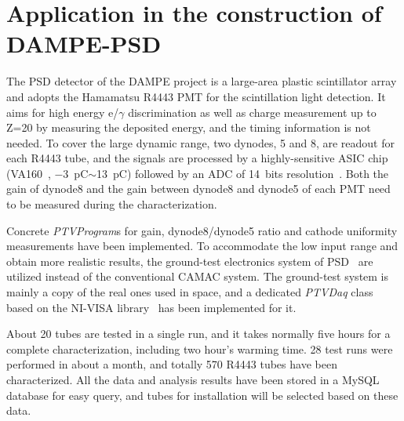 \documentclass{nst}
\begin{document}
\section{Application in the construction of DAMPE-PSD}
\label{sec:application}

The PSD detector of the DAMPE project is a large-area plastic scintillator array and adopts the Hamamatsu R4443 PMT for the scintillation light detection.
It aims for high energy e/$\gamma$ discrimination as well as charge measurement up to Z=20 by measuring the deposited energy, and the timing information is not needed.
To cover the large dynamic range, two dynodes, 5 and 8, are readout for each R4443 tube, 
and the signals are processed by a highly-sensitive ASIC chip (VA160~\cite{va160}, \SI{-3}{\pico\coulomb}$\sim$\SI{13}{\pico\coulomb}) followed by an ADC of 14~bits resolution~\cite{yanghaibo_fee}. 
Both the gain of dynode8 and the gain between dynode8 and dynode5 of each PMT need to be  measured during the characterization.

Concrete \textit{PTVProgram}s for gain, dynode8/dynode5 ratio and cathode uniformity measurements have been implemented.
To accommodate the low input range and obtain more realistic results, the ground-test electronics system of PSD~\cite{yanghaibo_fee} are utilized instead of the conventional CAMAC system. 
The ground-test system is mainly a copy of the real ones used in space, and a dedicated \textit{PTVDaq} class based on the NI-VISA library~\cite{ni_visa} has been implemented for it.

About 20 tubes are tested in a single run, and it takes normally five hours for a complete characterization, including two hour's warming time. 
28 test runs were performed in about a month, and totally 570 R4443 tubes have been characterized. 
All the data and analysis results have been stored in a MySQL database for easy query, and tubes for installation will be selected based on these data.
\end{document}
